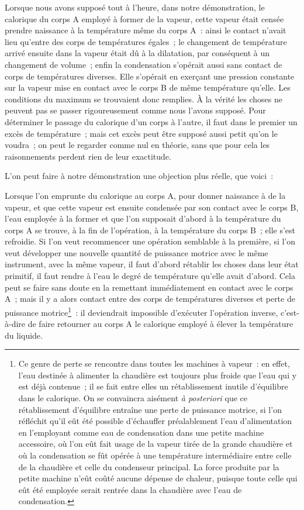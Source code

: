 \documentclass[french,twoside]{book} %
\begin{document}
Lorsque nous avons supposé tout à l’heure, dans notre démonstration, le calorique du corps A employé à former de la vapeur, cette vapeur était censée prendre naissance à la température même du corps A : ainsi le contact n’avait lieu qu’entre des corps de températures égales ; le changement de température arrivé ensuite dans la vapeur était dû à la dilatation, par conséquent à un changement de volume ; enfin la condensation s’opérait aussi sans contact de corps de températures diverses. Elle s’opérait en exerçant une pression constante sur la vapeur mise en contact avec le corps B de même température qu’elle. Les conditions du maximum se trouvaient donc remplies. À la vérité les choses ne peuvent pas se passer rigoureusement comme nous l’avons supposé. Pour déterminer le passage du calorique d’un corps à l’autre, il faut dans le premier un excès de température ; mais cet excès peut être supposé aussi petit qu’on le voudra ; on peut le regarder comme nul en théorie, sans que pour cela les raisonnements perdent rien de leur exactitude.\par
L’on peut faire à notre démonstration une objection plus réelle, que voici :\par
Lorsque l’on emprunte du calorique au corps A, pour donner naissance à de la vapeur, et que cette vapeur est ensuite condensée par son contact avec le corps B, l’eau employée à la former et que l’on supposait d’abord à la température du corps A se trouve, à la fin de l’opération, à la température du corps B ; elle s’est refroidie. Si l’on veut recommencer une opération semblable à la première, si l’on veut développer une nouvelle quantité de puissance motrice avec le même instrument, avec la même vapeur, il faut d’abord rétablir les choses dans leur état primitif, il faut rendre à l’eau le degré de température qu’elle avait d’abord. Cela peut se faire sans doute en la remettant immédiatement en contact avec le corps A ; mais il y a alors contact entre des corps de températures diverses et perte de puissance motrice\footnote{Ce genre de perte se rencontre dans toutes les machines à vapeur : en effet, l’eau destinée à alimenter la chaudière est toujours plus froide que l’eau qui y est déjà contenue ; il se fait entre elles un rétablissement inutile d’équilibre dans le calorique. On se convaincra aisément \emph{à posteriori} que ce rétablissement d’équilibre entraîne une perte de puissance motrice, si l’on réfléchit qu’il eût été possible d’échauffer préalablement l’eau d’alimentation en l’employant comme eau de condensation dans une petite machine accessoire, où l’on eût fait usage de la vapeur tirée de la grande chaudière et où la condensation se fût opérée à une température intermédiaire entre celle de la chaudière et celle du condenseur principal. La force produite par la petite machine n’eût coûté aucune dépense de chaleur, puisque toute celle qui eût été employée serait rentrée dans la chaudière avec l’eau de condensation.} : il deviendrait impossible d’exécuter l’opération inverse, c’est-à-dire de faire retourner au corps A le calorique employé à élever la température du liquide.\par
\end{document}

